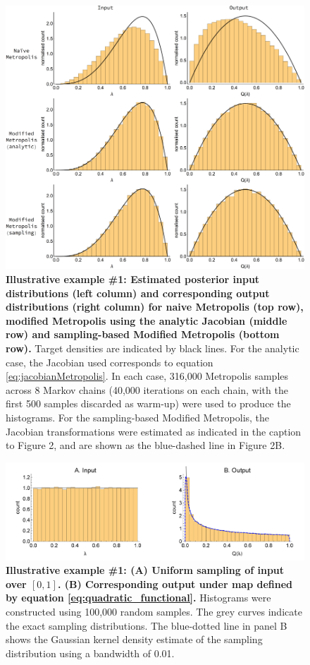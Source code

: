 \documentclass[10pt,letterpaper]{article}
\begin{document}
\begin{figure}[H]
	\centerline{\includegraphics[width=1.25\textwidth]{../figures/fig_1.pdf}}
	\caption{\textbf{Illustrative example \#1: Estimated posterior input distributions (left column) and corresponding output distributions (right column) for naive Metropolis (top row), modified Metropolis using the analytic Jacobian (middle row) and sampling-based Modified Metropolis (bottom row).} Target densities are indicated by black lines. For the analytic case, the Jacobian used corresponds to equation \ref{eq:jacobianMetropolis}. In each case, 316,000 Metropolis samples across 8 Markov chains (40,000 iterations on each chain, with the first 500 samples discarded as warm-up) were used to produce the histograms. For the sampling-based Modified Metropolis, the Jacobian transformations were estimated as indicated in the caption to Figure 2, and are shown as the blue-dashed line in Figure 2B.}
	\label{fig:example_1}
\end{figure}

\begin{figure}[H]
	\centerline{\includegraphics[width=1.25\textwidth]{../figures/fig_2.pdf}}
	\caption{\textbf{Illustrative example \#1: (A) Uniform sampling of input over $[0,1]$. (B) Corresponding output under map defined by equation \eqref{eq:quadratic_functional}.} Histograms were constructed using 100,000 random samples. The grey curves indicate the exact sampling distributions. The blue-dotted line in panel B shows the Gaussian kernel density estimate of the sampling distribution using a bandwidth of 0.01.}
	\label{fig:example_1_jacobian}
\end{figure}
\end{document}
